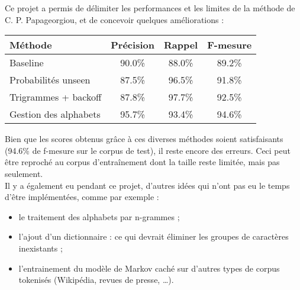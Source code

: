 
Ce projet a permis de délimiter les performances et les limites de la méthode de C. P. Papageorgiou, et de concevoir quelques améliorations :
\begin{center}
	\begin{tabular}{|l c c c|}
	  	\hline
	  	\textbf{Méthode} & \textbf{Précision} & \textbf{Rappel} & \textbf{F-mesure}\\
	  	\hline
	  	Baseline & 90.0\% & 88.0\% & 89.2\% \\
		Probabilités unseen & 87.5\% & 96.5\% & 91.8\% \\
		Trigrammes + backoff & 87.8\% & 97.7\% & 92.5\% \\
		Gestion des alphabets & 95.7\% & 93.4\% & 94.6\% \\
	  	\hline
	\end{tabular}
\end{center}
\vspace{0.3cm}

Bien que les scores obtenus grâce à ces diverses méthodes soient satisfaisants (94.6\% de f-mesure sur le corpus
de test), il reste encore des erreurs. Ceci peut être reproché au corpus d'entraînement dont la taille reste limitée, mais pas seulement.\\

Il y a également eu pendant ce projet, d'autres idées qui n'ont pas eu le temps d'être implémentées, comme par exemple :
\begin{itemize}
	\item le traitement des alphabets par n-grammes ;
	\item l'ajout d'un dictionnaire : ce qui devrait éliminer les groupes de caractères inexistants ;
	\item l'entrainement du modèle de Markov caché sur d'autres types de corpus tokenisés (Wikipédia, revues de presse, \dots).
\end{itemize}
